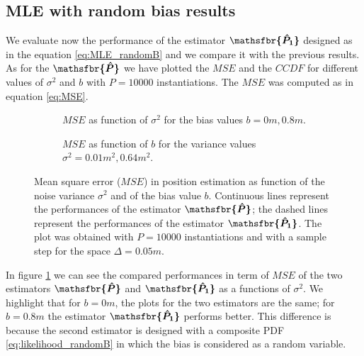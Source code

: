 \documentclass[%
    twoside, 
    a4paper
    ]{article}
\DeclareRobustCommand{\msf}[1]{%
  \ifcat\noexpand#1\relax\msfgreek{#1}\else\mathsfbr{#1}\fi%
}
\begin{document}
    \subsection{MLE with random bias results}
    We evaluate now the performance of the estimator $\bm{\msf{\hat{P}_1}}$ designed as in 
    the equation \ref{eq:MLE_randomB} and we compare it with the previous results.
    As for the $\bm{\msf{\hat{P}}}$ we have plotted the $MSE$ and the $CCDF$ for different values
    of $\sigma^2$ and $b$ with $P=10000$ instantiations.
    The $MSE$ was computed as in equation \ref{eq:MSE}.
    \begin{figure}[t]
        \begin{subfigure}[t]{0.49\linewidth}
            
            \caption{$MSE$ as function of $\sigma^2$ for the bias values \mbox{$b=0 \si{m}, 0.8 \si{m}$}.}
            \label{fig:MSE_comparison}
        \end{subfigure}
        \hfill
        \begin{subfigure}[t]{0.49\linewidth}
            
            \caption{$MSE$ as function of $b$ for the variance values \mbox{$\sigma^2=
            0.01 \si{m^2}, 0.64 \si{m^2}$}.}
            \label{fig:MSE_funcb_comparison}
        \end{subfigure}
        \caption{Mean square error ($MSE$) in position estimation as function of the noise variance 
        $\sigma^2$ and of the bias value $b$. Continuous lines represent the performances of the 
        estimator $\bm{\msf{\hat{P}}}$; the dashed lines represent the performances of the estimator 
        $\bm{\msf{\hat{P}_1}}$. The plot was obtained with $P=10000$ instantiations and 
        with a sample step for the space $\Delta = 0.05 \si{m}$.}
    \end{figure}

    In figure \ref{fig:MSE_comparison} we can see the compared performances in term of $MSE$
    of the two estimators $\bm{\msf{\hat{P}}}$ and $\bm{\msf{\hat{P}_1}}$ as a functions of 
    $\sigma^2$.
    We highlight that for $b=0\si{m}$, the plots for the two estimators are the same; for 
    $b=0.8\si{m}$ the estimator $\bm{\msf{\hat{P}_1}}$ performs better. This difference is 
    because the second estimator is designed with a composite PDF \ref{eq:likelihood_randomB} in 
    which the bias is considered as a random variable.
    
\end{document}
